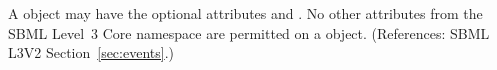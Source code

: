 A \Delay object may have the optional attributes   and
.  No other attributes from the SBML Level~3 Core namespace
are permitted on a \Delay object.  (References: SBML L3V2
Section~\ref{sec:events}.)
